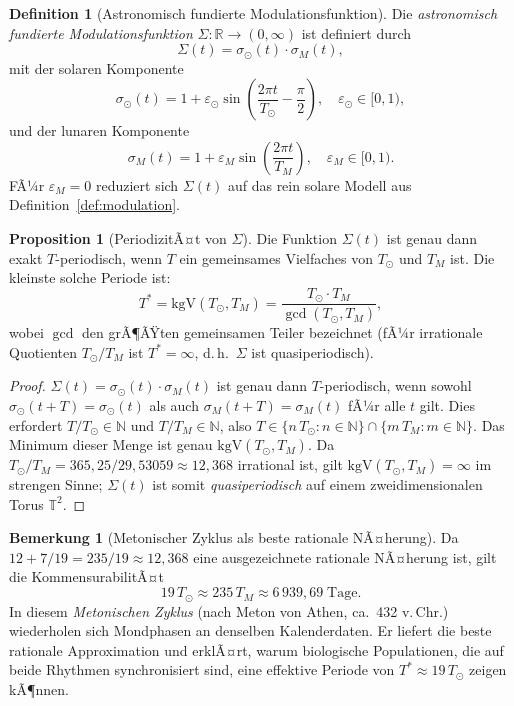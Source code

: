 ﻿\documentclass[12pt, a4paper]{article}
\theoremstyle{definition}
\newtheorem{proposition}[theorem]{Proposition}
\newtheorem{definition}[theorem]{Definition}
\newtheorem{bemerkung}[theorem]{Bemerkung}
\newcommand{\R}{\mathbb{R}}
\newcommand{\N}{\mathbb{N}}
\begin{document}
\begin{definition}[Astronomisch fundierte Modulationsfunktion]\label{def:sigma-astro}
Die \emph{astronomisch fundierte Modulationsfunktion} $\Sigma: \R \to (0,\infty)$
ist definiert durch
\begin{equation}\label{eq:sigma-astro}
  \Sigma(t) = \sigma_{\odot}(t)\cdot\sigma_M(t),
\end{equation}
mit der solaren Komponente
\[
  \sigma_{\odot}(t) = 1 + \varepsilon_{\odot}\sin\!\left(\frac{2\pi t}{T_{\odot}} - \frac{\pi}{2}\right),
  \quad \varepsilon_{\odot} \in [0,1),
\]
und der lunaren Komponente
\[
  \sigma_M(t) = 1 + \varepsilon_M \sin\!\left(\frac{2\pi t}{T_M}\right),
  \quad \varepsilon_M \in [0,1).
\]
FÃ¼r $\varepsilon_M = 0$ reduziert sich $\Sigma(t)$ auf das rein solare Modell
aus Definition~\ref{def:modulation}.
\end{definition}

\begin{proposition}[PeriodizitÃ¤t von $\Sigma$]\label{prop:sigma-periode}
Die Funktion $\Sigma(t)$ ist genau dann exakt $T$-periodisch, wenn $T$ ein
gemeinsames Vielfaches von $T_{\odot}$ und $T_M$ ist. Die kleinste solche
Periode ist:
\begin{equation}\label{eq:LCM}
  T^* = \mathrm{kgV}(T_{\odot}, T_M) = \frac{T_{\odot}\cdot T_M}{\gcd(T_{\odot}, T_M)},
\end{equation}
wobei $\gcd$ den grÃ¶ÃŸten gemeinsamen Teiler bezeichnet (fÃ¼r irrationale Quotienten
$T_{\odot}/T_M$ ist $T^* = \infty$, d.\,h.\ $\Sigma$ ist quasiperiodisch).
\end{proposition}

\begin{proof}
$\Sigma(t) = \sigma_{\odot}(t)\cdot\sigma_M(t)$ ist genau dann $T$-periodisch, wenn
sowohl $\sigma_{\odot}(t+T) = \sigma_{\odot}(t)$ als auch $\sigma_M(t+T) = \sigma_M(t)$
fÃ¼r alle $t$ gilt. Dies erfordert $T/T_{\odot} \in \N$ und $T/T_M \in \N$, also
$T \in \{n\,T_{\odot} : n \in \N\} \cap \{m\,T_M : m \in \N\}$. Das Minimum dieser
Menge ist genau $\mathrm{kgV}(T_{\odot}, T_M)$. Da $T_{\odot}/T_M = 365{,}25/29{,}53059
\approx 12{,}368$ irrational ist, gilt $\mathrm{kgV}(T_{\odot},T_M) = \infty$ im
strengen Sinne; $\Sigma(t)$ ist somit \emph{quasiperiodisch} auf einem
zweidimensionalen Torus $\mathbb{T}^2$. \hfill
\end{proof}

\begin{bemerkung}[Metonischer Zyklus als beste rationale NÃ¤herung]
Da $12 + 7/19 = 235/19 \approx 12{,}368$ eine ausgezeichnete rationale NÃ¤herung
ist, gilt die KommensurabilitÃ¤t
\[
  19\,T_{\odot} \approx 235\,T_M \approx 6\,939{,}69\;\text{Tage}.
\]
In diesem \emph{Metonischen Zyklus} (nach Meton von Athen, ca.\ 432 v.\,Chr.)
wiederholen sich Mondphasen an denselben Kalenderdaten. Er liefert die beste
rationale Approximation und erklÃ¤rt, warum biologische Populationen,
die auf beide Rhythmen synchronisiert sind, eine effektive Periode von
$T^* \approx 19\,T_{\odot}$ zeigen kÃ¶nnen.
\end{bemerkung}
\end{document}
